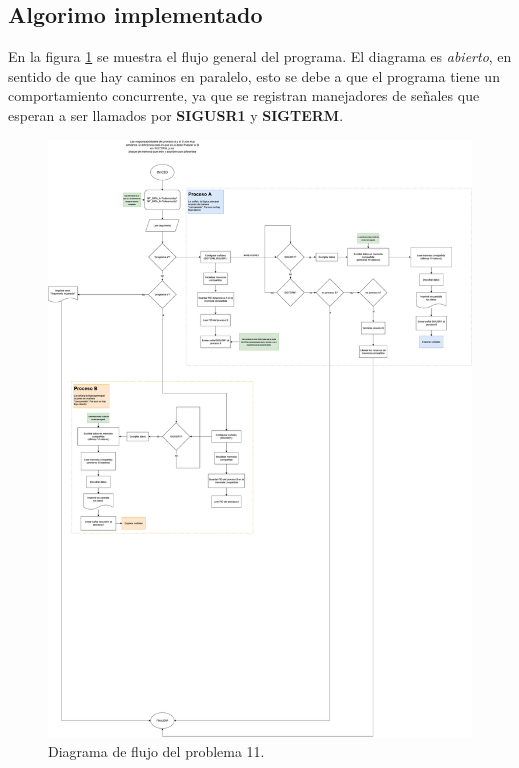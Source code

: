 \documentclass[letterpaper, 10 pt, conference]{ieeeconf}  %
\begin{document}
\subsection{Algorimo implementado}
En la figura \ref{fig:diag_flujo_p11} se muestra el flujo general del programa. El diagrama es \textit{abierto}, en sentido de que hay caminos en paralelo, esto se debe a que el programa tiene un comportamiento concurrente, ya que se registran manejadores de señales que esperan a ser llamados por \textbf{SIGUSR1} y \textbf{SIGTERM}.
\begin{figure}[tb]
  \centering
  \includegraphics[width=\textwidth]{./diagrama_flujo_tp2.png}
  \caption{Diagrama de flujo del problema 11.}
  \label{fig:diag_flujo_p11}
\end{figure}
\end{document}
